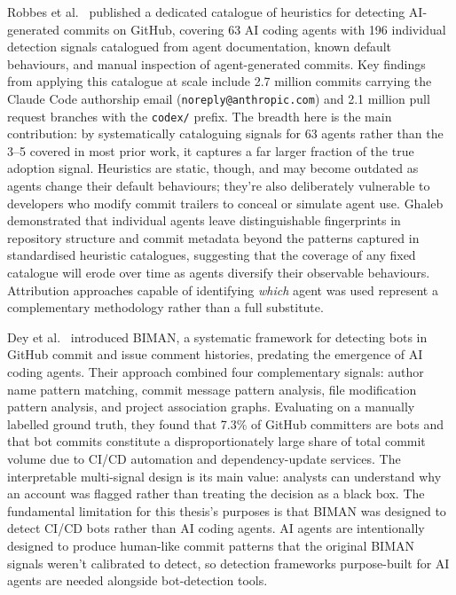 Robbes et al.~\cite{robbesHeuristics2026} published a dedicated catalogue of
heuristics for detecting AI-generated commits on GitHub, covering 63 AI coding
agents with 196 individual detection signals catalogued from agent documentation,
known default behaviours, and manual inspection of agent-generated commits. Key
findings from applying this catalogue at scale include 2.7 million commits
carrying the Claude Code authorship email (\texttt{noreply@anthropic.com}) and
2.1 million pull request branches with the \texttt{codex/} prefix. The breadth
here is the main contribution: by systematically cataloguing signals for 63 agents
rather than the 3--5 covered in most prior work, it captures a far larger fraction
of the true adoption signal. Heuristics are static, though, and may become outdated
as agents change their default behaviours; they're also deliberately vulnerable to
developers who modify commit trailers to conceal or simulate agent use.
Ghaleb~\cite{ghaleb2026} demonstrated that individual agents leave distinguishable
fingerprints in repository structure and commit metadata beyond the patterns captured
in standardised heuristic catalogues, suggesting that the coverage of any fixed
catalogue will erode over time as agents diversify their observable behaviours.
Attribution approaches capable of identifying \emph{which} agent was used represent
a complementary methodology rather than a full substitute.

Dey et al.~\cite{dey2020biman} introduced BIMAN, a systematic framework for
detecting bots in GitHub commit and issue comment histories, predating the
emergence of AI coding agents. Their approach combined four complementary signals:
author name pattern matching, commit message pattern analysis, file modification
pattern analysis, and project association graphs. Evaluating on a manually labelled
ground truth, they found that 7.3\% of GitHub committers are bots and that bot
commits constitute a disproportionately large share of total commit volume due to
CI/CD automation and dependency-update services. The interpretable multi-signal
design is its main value: analysts can understand why an account was flagged rather
than treating the decision as a black box. The fundamental limitation for this
thesis's purposes is that BIMAN was designed to detect CI/CD bots rather than AI
coding agents. AI agents are intentionally designed to produce human-like commit
patterns that the original BIMAN signals weren't calibrated to detect, so detection
frameworks purpose-built for AI agents are needed alongside bot-detection tools.

